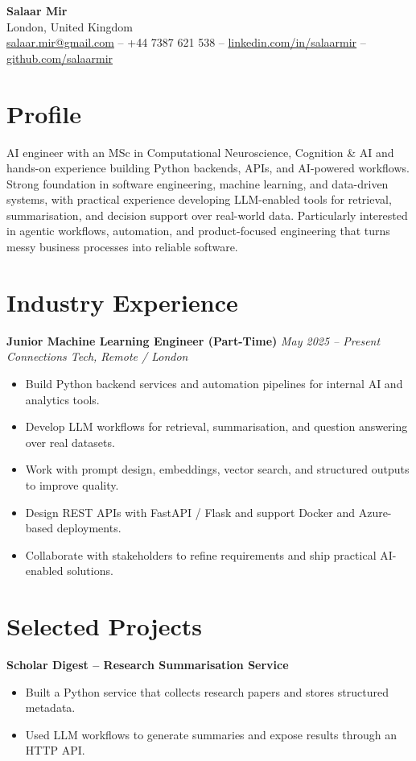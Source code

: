 \documentclass[a4paper,10pt]{article}
\begin{document}
\begin{center}
    {\LARGE \textbf{Salaar Mir}}\\[4pt]
    London, United Kingdom \\[2pt]
    \href{mailto:salaar.mir@gmail.com}{salaar.mir@gmail.com} \quad -- \quad
    +44 7387 621 538 \quad -- \quad
    \href{https://www.linkedin.com/in/salaarmir}{linkedin.com/in/salaarmir} \quad -- \quad
    \href{https://github.com/salaarmir}{github.com/salaarmir}
\end{center}

\section*{Profile}
AI engineer with an MSc in Computational Neuroscience, Cognition \& AI and hands-on experience building Python backends, APIs, and AI-powered workflows. Strong foundation in software engineering, machine learning, and data-driven systems, with practical experience developing LLM-enabled tools for retrieval, summarisation, and decision support over real-world data. Particularly interested in agentic workflows, automation, and product-focused engineering that turns messy business processes into reliable software.

\section*{Industry Experience}
\textbf{Junior Machine Learning Engineer (Part-Time)} \hfill \textit{May 2025 -- Present}\\
\textit{Connections Tech, Remote / London}
\begin{itemize}
    \item Build Python backend services and automation pipelines for internal AI and analytics tools.
    \item Develop LLM workflows for retrieval, summarisation, and question answering over real datasets.
    \item Work with prompt design, embeddings, vector search, and structured outputs to improve quality.
    \item Design REST APIs with FastAPI / Flask and support Docker and Azure-based deployments.
    \item Collaborate with stakeholders to refine requirements and ship practical AI-enabled solutions.
\end{itemize}

\section*{Selected Projects}
\textbf{Scholar Digest -- Research Summarisation Service}
\begin{itemize}
    \item Built a Python service that collects research papers and stores structured metadata.
    \item Used LLM workflows to generate summaries and expose results through an HTTP API.
\end{itemize}
\end{document}
